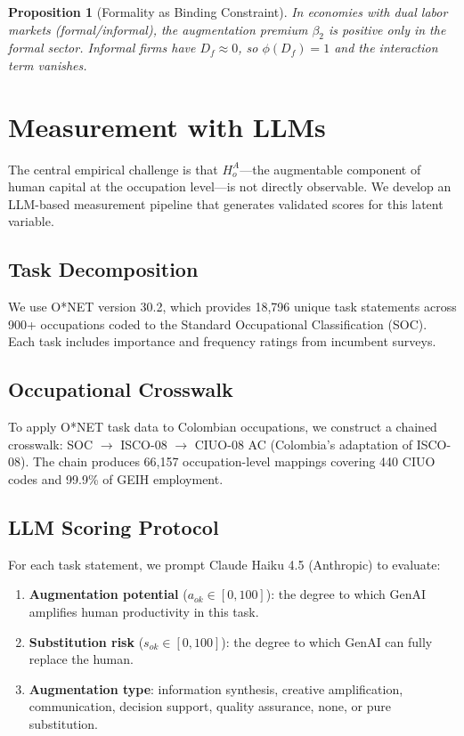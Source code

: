 \documentclass[12pt,a4paper]{article}
\newtheorem{proposition}{Proposition}
\begin{document}
\begin{proposition}[Formality as Binding Constraint]
\label{prop:formality}
In economies with dual labor markets (formal/informal), the augmentation premium $\beta_2$ is positive only in the formal sector. Informal firms have $D_f \approx 0$, so $\phi(D_f) = 1$ and the interaction term vanishes.
\end{proposition}


\section{Measurement with LLMs}
\label{sec:measurement}

The central empirical challenge is that $H_o^A$---the augmentable component of human capital at the occupation level---is not directly observable. We develop an LLM-based measurement pipeline that generates validated scores for this latent variable.

\subsection{Task Decomposition}

We use O*NET version 30.2, which provides 18,796 unique task statements across 900+ occupations coded to the Standard Occupational Classification (SOC). Each task includes importance and frequency ratings from incumbent surveys.

\subsection{Occupational Crosswalk}

To apply O*NET task data to Colombian occupations, we construct a chained crosswalk: SOC $\to$ ISCO-08 $\to$ CIUO-08 AC (Colombia's adaptation of ISCO-08). The chain produces 66,157 occupation-level mappings covering 440 CIUO codes and 99.9\% of GEIH employment.

\subsection{LLM Scoring Protocol}

For each task statement, we prompt Claude Haiku 4.5 (Anthropic) to evaluate:
\begin{enumerate}
\item \textbf{Augmentation potential} ($a_{ok} \in [0, 100]$): the degree to which GenAI amplifies human productivity in this task.
\item \textbf{Substitution risk} ($s_{ok} \in [0, 100]$): the degree to which GenAI can fully replace the human.
\item \textbf{Augmentation type}: information synthesis, creative amplification, communication, decision support, quality assurance, none, or pure substitution.
\end{enumerate}
\end{document}
